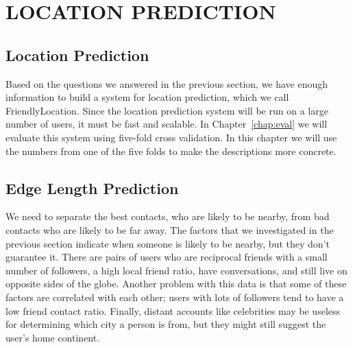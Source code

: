 \ifdefined\THESIS
    \chapter{\uppercase{Location Prediction}}
\else
    \section{Location Prediction}
\fi

Based on the questions we answered in the previous section, we have enough
information to build a system for location prediction, which we call
FriendlyLocation.
%
Since the location prediction system will be run on a large number of users,
it must be fast and scalable.
%
In Chapter~\ref{chap:eval} we will evaluate this system using five-fold cross
validation.
%
In this chapter we will use the numbers from one of the five folds to make
the descriptions more concrete.

\section{Edge Length Prediction}

We need to separate the best contacts, who are likely to be nearby, from
bad contacts who are likely to be far away.
%
The factors that we investigated in the previous section indicate when someone
is likely to be nearby, but they don't guarantee it.
%
There are pairs of users who are reciprocal friends with a small number of
followers, a high local friend ratio, have conversations, and still live on
opposite sides of the globe.
%
Another problem with this data is that some of these factors are correlated
with each other; users with lots of followers tend to have a low friend contact
ratio.
%
Finally, distant accounts like celebrities may be useless for determining which
city a person is from, but they might still suggest the user's home continent.

